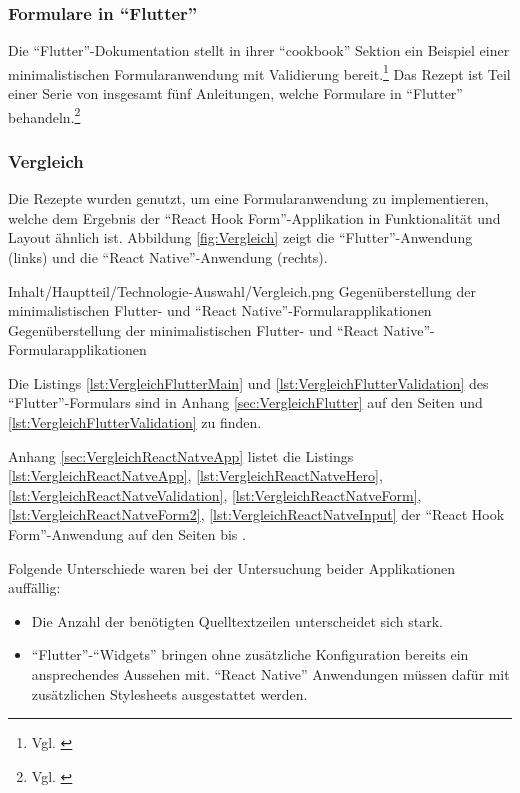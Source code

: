 \subsubsection{Formulare in \enquote{Flutter}}
Die \enquote{Flutter}-Dokumentation stellt in ihrer \enquote{cookbook} Sektion ein Beispiel einer minimalistischen Formularanwendung mit Validierung bereit.\footnote{Vgl. \cite{BuildAFormWithValidation}}
Das Rezept ist Teil einer Serie von insgesamt fünf Anleitungen, welche Formulare in \enquote{Flutter} behandeln.\footnote{Vgl. \cite{FormsFlutter}}

\subsubsection{Vergleich}

Die Rezepte wurden genutzt,
um eine Formularanwendung zu implementieren,
welche dem Ergebnis der \enquote{React Hook Form}-Applikation in Funktionalität und Layout ähnlich ist.
Abbildung \ref{fig:Vergleich} zeigt die \enquote{Flutter}-Anwendung (links) und die \enquote{React Native}-Anwendung (rechts).

\begin{alexfigure}{Inhalt/Hauptteil/Technologie-Auswahl/Vergleich.png}
   {Gegenüberstellung der minimalistischen {Flutter}- und \enquote{React Native}-Formular\-ap\-pli\-ka\-ti\-on\-en}
   {Gegenüberstellung der minimalistischen {Flutter}- und \enquote{React Native}-Formular\-ap\-pli\-ka\-ti\-on\-en}
 
   \label{fig:Vergleich}
 
 \end{alexfigure}

 Die Listings \ref{lst:VergleichFlutterMain} und \ref{lst:VergleichFlutterValidation}
 des \enquote{Flutter}-Formulars sind in Anhang \ref{sec:VergleichFlutter}
 auf den Seiten \pageref{lst:VergleichFlutterMain} und \ref{lst:VergleichFlutterValidation} zu finden.

 Anhang \ref{sec:VergleichReactNatveApp} listet die Listings
 \ref{lst:VergleichReactNatveApp},
 \ref{lst:VergleichReactNatveHero},
 \ref{lst:VergleichReactNatveValidation},
 \ref{lst:VergleichReactNatveForm},
  \ref{lst:VergleichReactNatveForm2},
 \ref{lst:VergleichReactNatveInput} 
 der \enquote{React Hook Form}-Anwendung auf den Seiten \pageref{lst:VergleichReactNatveApp} bis \pageref{lst:VergleichReactNatveInput}.

Folgende Unterschiede waren bei der Untersuchung beider Applikationen auffällig:
\begin{itemize}[topsep=0pt,itemsep=-1ex,partopsep=1ex,parsep=1ex]
   \item Die Anzahl der benötigten Quelltextzeilen unterscheidet sich stark.
   \item \enquote{Flutter}-\enquote{Widgets} bringen ohne zusätzliche Konfiguration bereits ein ansprechendes Aussehen mit. \enquote{React Native} Anwendungen müssen dafür mit zusätzlichen Stylesheets ausgestattet werden. 
\end{itemize}

